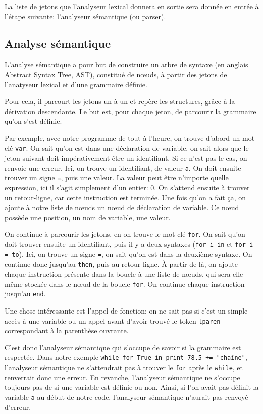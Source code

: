 \documentclass{article}
\begin{document}
La liste de jetons que l’analyseur lexical donnera en sortie sera donnée en entrée à l’étape
suivante\nobreakspace: l’analyseur sémantique (ou parser).

\subsection{Analyse sémantique}
L’analyse sémantique a pour but de construire un arbre de syntaxe (en anglais Abstract Syntax
Tree, AST), constitué de nœuds, à partir des jetons de l’anatyseur lexical et d’une grammaire
définie.

Pour cela, il parcourt les jetons un à un et repère les structures, grâce à la dérivation descendante.
Le but est, pour chaque jeton, de parcourir la grammaire qu’on s’est définie.

Par exemple, avec notre programme de tout à l’heure, on trouve d’abord un mot-clé \verb|var|. 
On sait qu’on est dans une déclaration de variable, on sait alors que le jeton suivant doit
impérativement être un identifiant. Si ce n’est pas le cas, on renvoie une erreur.
Ici, on trouve un identifiant, de valeur \verb|a|. On doit ensuite trouver un signe \verb|=|,
puis une valeur. La valeur peut être n’importe quelle expression, ici il s’agit simplement d’un
entier\nobreakspace: 0. On s’attend ensuite à trouver un retour-ligne, car cette instruction est terminée.
Une fois qu’on a fait ça, on ajoute à notre liste de nœuds un nœud de déclaration de variable. Ce
nœud possède une position, un nom de variable, une valeur.

On continue à parcourir les jetons, en on trouve le mot-clé \verb|for|. On sait qu’on doit trouver
ensuite un identifiant, puis il y a deux syntaxes (\verb|for i in| et \verb|for i = to|). Ici, on trouve
un signe \verb|=|, on sait qu’on est dans la deuxième syntaxe. On continue donc jusqu’au \verb|then|,
puis au retour-ligne. À partir de là, on ajoute chaque instruction présente dans la boucle à une liste
de nœuds, qui sera elle-même stockée dans le nœud de la boucle \verb|for|. On continue chaque instruction
jusqu’au \verb|end|.

Une chose intéressante est l’appel de fonction\nobreakspace: on ne sait pas si c’est un simple accès à une
variable ou un appel avant d’avoir trouvé le token \verb|lparen| correspondant à la parenthèse ouvrante.

C’est donc l’analyseur sémantique qui s’occupe de savoir si la grammaire est respectée. Dans notre
exemple \verb|while for True in print 78.5 += "chaîne"|, l’analyseur sémantique
ne s’attendrait pas à trouver le \verb|for| après le \verb|while|, et renverrait donc une erreur.
En revanche, l’analyseur sémantique ne s’occupe toujours pas de si une variable est définie ou non.
Ainsi, si l’on avait pas définit la variable \verb|a| au début de notre code, l’analyseur sémantique
n’aurait pas renvoyé d’erreur.
\end{document}
